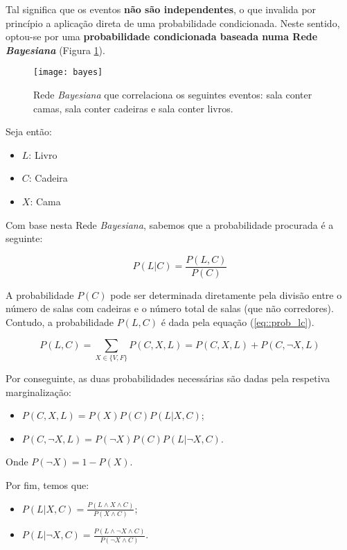 Tal significa que os eventos \textbf{não são independentes}, o que invalida por princípio a aplicação direta de uma probabilidade condicionada. Neste sentido, optou-se por uma \textbf{probabilidade condicionada baseada numa Rede \textit{Bayesiana}} (Figura \ref{fig::bayes}).

\begin{figure}[!htbp]
    \centering
    \texttt{[image: bayes]}
    \caption[Rede \textit{Bayesiana} para a pergunta 7]{Rede \textit{Bayesiana} que correlaciona os seguintes eventos: sala conter camas, sala conter cadeiras e sala conter livros.}
    \label{fig::bayes}
\end{figure}

Seja então:
\begin{itemize}[nosep]
    \item $L$: Livro
    \item $C$: Cadeira
    \item $X$: Cama
\end{itemize}

Com base nesta Rede \textit{Bayesiana}, sabemos que a probabilidade procurada é a seguinte:

\begin{equation}
    P(L|C) = \frac{P(L,C)}{P(C)}
\end{equation}

A probabilidade $P(C)$ pode ser determinada diretamente pela divisão entre o número de salas com cadeiras e o número total de salas (que não corredores). Contudo, a probabilidade $P(L,C)$ é dada pela equação (\ref{eq::prob_lc}).

\begin{equation}
    P(L,C) = \sum_{X \in \{V,F\}}{P(C,X,L)} = P(C,X,L) + P(C,\neg X,L)
    \label{eq::prob_lc}
\end{equation}

Por conseguinte, as duas probabilidades necessárias são dadas pela respetiva marginalização:
\begin{itemize}
    \item $P(C,X,L) = P(X)P(C)P(L|X,C)$;
    \item $P(C,\neg X,L) = P(\neg X)P(C)P(L|\neg X,C)$.
\end{itemize}

Onde $P(\neg X) = 1-P(X)$.

Por fim, temos que:
\begin{itemize}
    \item $P(L|X,C) = \frac{P(L \wedge X \wedge C)}{P(X \wedge C)}$;
    \item $P(L|\neg X,C) = \frac{P(L \wedge \neg X \wedge C)}{P(\neg X \wedge C)}$.
\end{itemize}

